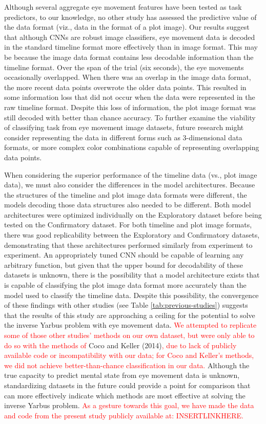 \documentclass[
  english,
  man, donotrepeattitle,floatsintext]{apa6}
\begin{document}
Although several aggregate eye movement features have been tested as task predictors, to our knowledge, no other study has assessed the predictive value of the data format (viz., data in the format of a plot image). Our results suggest that although CNNs are robust image classifiers, eye movement data is decoded in the standard timeline format more effectively than in image format. This may be because the image data format contains less decodable information than the timeline format. Over the span of the trial (six seconds), the eye movements occasionally overlapped. When there was an overlap in the image data format, the more recent data points overwrote the older data points. This resulted in some information loss that did not occur when the data were represented in the raw timeline format. Despite this loss of information, the plot image format was still decoded with better than chance accuracy. To further examine the viability of classifying task from eye movement image datasets, future research might consider representing the data in different forms such as 3-dimensional data formats, or more complex color combinations capable of representing overlapping data points.

When considering the superior performance of the timeline data (vs., plot image data), we must also consider the differences in the model architectures. Because the structures of the timeline and plot image data formats were different, the models decoding those data structures also needed to be different. Both model architectures were optimized individually on the Exploratory dataset before being tested on the Confirmatory dataset. For both timeline and plot image formats, there was good replicability between the Exploratory and Confirmatory datasets, demonstrating that these architectures performed similarly from experiment to experiment. An appropriately tuned CNN should be capable of learning any arbitrary function, but given that the upper bound for decodability of these datasets is unknown, there is the possibility that a model architecture exists that is capable of classifying the plot image data format more accurately than the model used to classify the timeline data. Despite this possibility, the convergence of these findings with other studies (see Table \ref{tab:previous-studies}) suggests that the results of this study are approaching a ceiling for the potential to solve the inverse Yarbus problem with eye movement data. \textcolor{red}{We attempted to replicate some of those other studies' methods on our own dataset, but were only able to do so with the methods of }Coco and Keller (2014)\textcolor{red}{, due to lack of publicly available code or incompatibility with our data; for Coco and Keller's methods, we did not achieve better-than-chance classification in our data.} Although the true capacity to predict mental state from eye movement data is unknown, standardizing datasets in the future could provide a point for comparison that can more effectively indicate which methods are most effective at solving the inverse Yarbus problem. \textcolor{red}{As a gesture towards this goal, we have made the data and code from the present study publicly available at: INSERTLINKHERE.}
\end{document}
